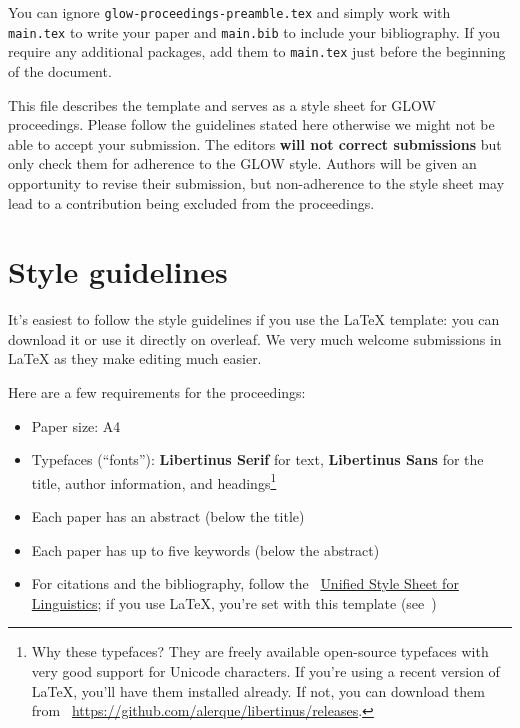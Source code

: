 You can ignore \texttt{glow-proceedings-preamble.tex} and simply work with
\texttt{main.tex} to write your paper and \texttt{main.bib} to include your
bibliography. If you require any additional packages, add them to
\texttt{main.tex} just before the beginning of the document.

This file describes the template and serves as a style sheet for GLOW
proceedings. Please follow the guidelines stated here otherwise we might not be
able to accept your submission. The editors \textbf{will not correct
submissions} but only check them for adherence to the GLOW style. Authors will
be given an opportunity to revise their submission, but non-adherence to the
style sheet may lead to a contribution being excluded from the proceedings.

\section{Style guidelines}

It's easiest to follow the style guidelines if you use the \LaTeX{} template:
you can download it or use it directly on overleaf. We very much welcome
submissions in \LaTeX{} as they make editing much easier.

Here are a few requirements for the proceedings:

\begin{itemize}
    \item Paper size: A4
    \item Typefaces (\enquote{fonts}): \textbf{Libertinus Serif} for text,
        \textbf{Libertinus Sans} for the title, author information, and
        headings\footnote{Why these typefaces? They are freely available
        open-source typefaces with very good support for Unicode characters.
        If you're using a recent version of \LaTeX{}, you'll have them
        installed already. If not, you can download them from
        \faExternalLink*{}~\url{https://github.com/alerque/libertinus/releases}.}
    \item Each paper has an abstract (below the title)
    \item Each paper has up to five keywords (below the abstract)
    \item For citations and the bibliography, follow the
    \faExternalLink*{}~\href{https://clas.wayne.edu/linguistics/resources/style}{Unified
    Style Sheet for Linguistics}; if you use \LaTeX{}, you're set with this
    template (see~)
\end{itemize}

